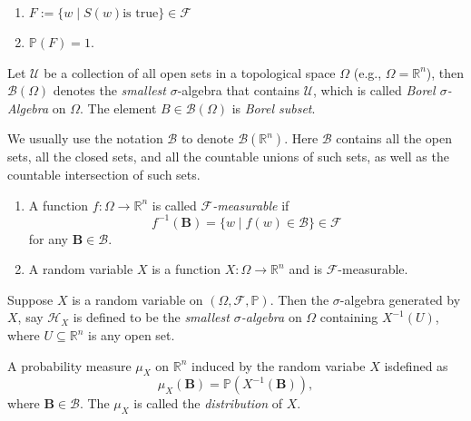 \begin{enumerate}
\begin{definition}
\begin{enumerate}
\item
$F:=\{w\mid S(w)\mbox{is true}\}\in\mathcal{F}$
\item
$\mathbb{P}(F)=1$.
\end{enumerate}
\end{definition}
\begin{definition}
Let $\mathcal{U}$ be a collection of all open sets in a topological space $\Omega$ (e.g., $\Omega=\mathbb{R}^n$), then $\mathcal{B}(\Omega)$ denotes the \emph{smallest} $\sigma$-algebra that contains $\mathcal{U}$, which is called \emph{Borel $\sigma$-Algebra} on $\Omega$. The element $B\in\mathcal{B}(\Omega)$ is \emph{Borel subset}.
\end{definition}
\begin{remark}
We usually use the notation $\mathcal{B}$ to denote $\mathcal{B}(\mathbb{R}^n)$. Here $\mathcal{B}$ contains all the open sets, all the closed sets, and all the countable unions of such sets, as well as the countable intersection of such sets.
\end{remark}
\begin{definition}
\begin{enumerate}
\item
A function $f:\Omega\to\mathbb{R}^n$ is called \emph{$\mathcal{F}$-measurable} if
\[
f^{-1}(\bm B)=\{w\mid f(w)\in\mathcal{B}\}\in\mathcal{F}
\]
for any $\bm B\in\mathcal{B}$.
\item
A random variable $X$ is a function $X:\Omega\to\mathbb{R}^n$ and is $\mathcal{F}$-measurable.
\end{enumerate}
\end{definition}
\begin{definition}
Suppose $X$ is a random variable on $(\Omega,\mathcal{F},\mathbb{P})$. Then the $\sigma$-algebra generated by $X$, say $\mathcal{H}_X$ is defined to be the \emph{smallest $\sigma$-algebra} on $\Omega$ containing $X^{-1}(U)$, where $U\subseteq\mathbb{R}^n$ is any open set.
\end{definition}
\begin{definition}[Distribution]
A probability measure $\mu_X$ on $\mathbb{R}^n$ induced by the random variabe $X$ isdefined as
\[
\mu_X(\bm B)=\mathbb{P}(X^{-1}(\bm B)),
\]
where $\bm B\in\mathcal{B}$. The $\mu_X$ is called the \emph{distribution} of $X$.
\end{definition}
\begin{definition}[Integrable]

\end{definition}
\end{enumerate}
